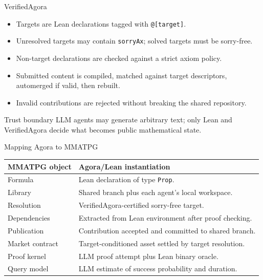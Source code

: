 \documentclass[10pt,aspectratio=169]{beamer}
\begin{document}
\begin{frame}{VerifiedAgora}
\small
\begin{itemize}
  \item Targets are Lean declarations tagged with \texttt{@[target]}.
  \item Unresolved targets may contain \texttt{sorryAx}; solved targets must be sorry-free.
  \item Non-target declarations are checked against a strict axiom policy.
  \item Submitted content is compiled, matched against target descriptors, automerged if valid, then rebuilt.
  \item Invalid contributions are rejected without breaking the shared repository.
\end{itemize}

\begin{block}{Trust boundary}
LLM agents may generate arbitrary text; only Lean and VerifiedAgora decide what becomes public mathematical state.
\end{block}
\end{frame}

\begin{frame}{Mapping Agora to MMATPG}
\small
\begin{tabular}{p{}p{}}
\toprule
\textbf{MMATPG object} & \textbf{Agora/Lean instantiation} \\
\midrule
Formula & Lean declaration of type \texttt{Prop}. \\
Library & Shared branch plus each agent's local workspace. \\
Resolution & VerifiedAgora-certified sorry-free target. \\
Dependencies & Extracted from Lean environment after proof checking. \\
Publication & Contribution accepted and committed to shared branch. \\
Market contract & Target-conditioned asset settled by target resolution. \\
Proof kernel & LLM proof attempt plus Lean binary oracle. \\
Query model & LLM estimate of success probability and duration. \\
\bottomrule
\end{tabular}
\end{frame}
\end{document}
